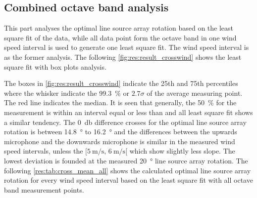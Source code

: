 \subsection{Combined octave band analysis}\label{res:ana:comb}
This part analyses the optimal line source array rotation based on the least square fit of the data, while all data point form the octave band in one wind speed interval is used to generate one least square fit. The wind speed interval is as the former analysis. The following \autoref{fig:res:result_crosswind} shows the least square fit with box plots analysis. 
 
 
 

 

The boxes in \autoref{fig:res:result_crosswind} indicate the 25th and 75th percentiles where the whisker indicate the \SI{99.3}{\percent} or $2.7\sigma$ of the average measuring point. The red line indicates the median. It is seen that generally, the \SI{50}{\percent} for the measurement is within an interval equal or less than  and all least square fit shows a similar tendency. The \SI{0}{\decibel} difference crosses for the optimal line source array rotation is between \SI{14.8}{\degree} to \SI{16.2}{\degree} and the differences between the upwards microphone and the downwards microphone is similar in the measured wind speed intervals, unless the $[\SI{5}{\meter\per\second},\, \SI{6}{\meter\per\second}[ $ which show slightly less slope. The lowest deviation is founded at the measured \SI{20}{\degree} line source array rotation. The following \autoref{res:tab:cross_mean_all} shows the calculated optimal line source array rotation for every wind speed interval based on the least square fit with all octave band measurement points.
 
